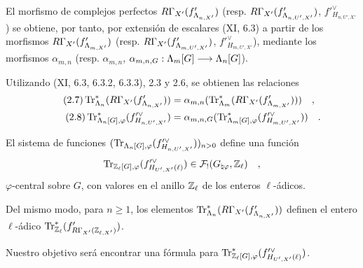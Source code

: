 El morfismo de complejos perfectos $R\Gamma_{X'}(f'_{\Lambda_{n,X'}})$ (resp. $R\Gamma_{X'}(f'_{\Lambda_{n,U',X'}})$, $f'^\vee_{H_{n,U',X'}}$) se obtiene, por tanto, por extensión de escalares (XI, 6.3) a partir de los morfismos $R\Gamma_{X'}(f'_{\Lambda_{m,X'}})$ (resp. $R\Gamma_{X'}(f'_{\Lambda_{m,U',X'}})$, $f'^\vee_{H_{m,U',X'}}$), mediante los morfismos $\alpha_{m,n}$ (resp. $\alpha_{m,n}$, $\alpha_{m,n,G} : \Lambda_m[G] \longrightarrow \Lambda_n[G]$).

Utilizando (XI, 6.3, 6.3.2, 6.3.3), 2.3 y 2.6, se obtienen las relaciones
\begin{align}
\tag{2.7} \operatorname{Tr}^*_{\Lambda_n}(R\Gamma_{X'}(f'_{\Lambda_{n,X'}})) &= \alpha_{m,n}(\operatorname{Tr}^*_{\Lambda_m}(R\Gamma_{X'}(f'_{\Lambda_{m,X'}}))) \quad , \\
\tag{2.8} \operatorname{Tr}^*_{\Lambda_n[G],\varphi}(f'^\vee_{H_{n,U',X'}}) &= \alpha_{m,n,G}(\operatorname{Tr}^*_{\Lambda_m[G],\varphi}(f'^\vee_{H_{m,U',X'}})) \quad .
\end{align}

El sistema de funciones $(\operatorname{Tr}_{\Lambda_n[G],\varphi}(f'^\vee_{H_{n,U',X'}}))_{n>0}$ define una función
\[
\operatorname{Tr}_{\mathbb Z_\ell[G],\varphi}(f'^\vee_{H_{U',X'}(\ell)}) \in \mathcal{F}_!(G_{\natural\varphi}, \mathbb Z_\ell) \quad ,
\]
$\varphi$-central sobre $G$, con valores en el anillo $\mathbb Z_\ell$ de los enteros $\ell$-ádicos.

Del mismo modo, para $n \geq 1$, los elementos $\operatorname{Tr}^*_{\Lambda_n}(R\Gamma_{X'}(f'_{\Lambda_{n,X'}}))$ definen el entero $\ell$-ádico $\operatorname{Tr}^*_{\mathbb Z_\ell}(f'_{R\Gamma_{X'}(\mathbb Z_{\ell,X'})})$.

Nuestro objetivo será encontrar una fórmula para $\operatorname{Tr}^*_{\mathbb Z_\ell[G],\varphi}(f'^\vee_{H_{U',X'}(\ell)})$.
